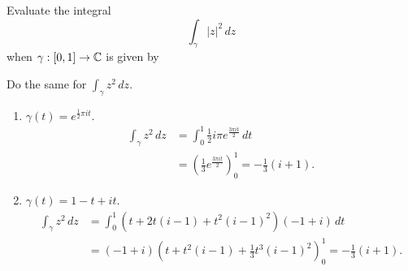 \setcounter{question}{5}
\question Evaluate the integral
\[
    \int_\gamma \lvert z \rvert^2 \,dz
\]
when $\gamma: [0,1] \to \mathbb{C}$ is given by
Do the same for $\int_\gamma z^2 \,dz$.
\begin{solution}
    \begin{enumerate}
        \item $\gamma(t) = e^{\frac12\pi i t}$.
            \begin{align*}
                \int_\gamma z^2 \,dz
                &= \int_0^1 \frac12i\pi e^{\frac{3\pi it}2} \,dt \\
                &= \left(\frac13e^{\frac{3\pi it}2}\right)^1_0 = -\frac13(i + 1).
            \end{align*}

        \item $\gamma(t) = 1 - t + it$.
            \begin{align*}
                \int_\gamma z^2 \,dz
                &= \int_0^1 (t + 2t(i-1) + t^2(i-1)^2)(-1+i) \,dt \\
                &= (-1+i) \left(t + t^2(i-1) + \frac13t^3(i-1)^2\right)^1_0 
                = -\frac13(i+1).
            \end{align*}
    \end{enumerate}
\end{solution}
